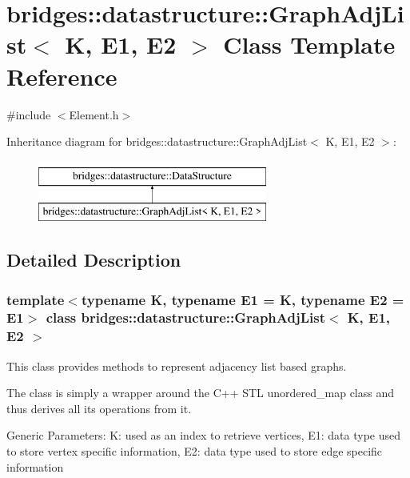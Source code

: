 \hypertarget{classbridges_1_1datastructure_1_1_graph_adj_list}{}\section{bridges\+:\+:datastructure\+:\+:Graph\+Adj\+List$<$ K, E1, E2 $>$ Class Template Reference}
\label{classbridges_1_1datastructure_1_1_graph_adj_list}


{\ttfamily \#include $<$Element.\+h$>$}

Inheritance diagram for bridges\+:\+:datastructure\+:\+:Graph\+Adj\+List$<$ K, E1, E2 $>$\+:\begin{figure}[H]
\begin{center}
\leavevmode
\includegraphics[height=2.000000cm]{classbridges_1_1datastructure_1_1_graph_adj_list}
\end{center}
\end{figure}


\subsection{Detailed Description}
\subsubsection*{template$<$typename K, typename E1 = K, typename E2 = E1$>$\newline
class bridges\+::datastructure\+::\+Graph\+Adj\+List$<$ K, E1, E2 $>$}

This class provides methods to represent adjacency list based graphs. 

The class is simply a wrapper around the C++ S\+TL unordered\+\_\+map class and thus derives all its operations from it.

Generic Parameters\+: K\+: used as an index to retrieve vertices, E1\+: data type used to store vertex specific information, E2\+: data type used to store edge specific information

